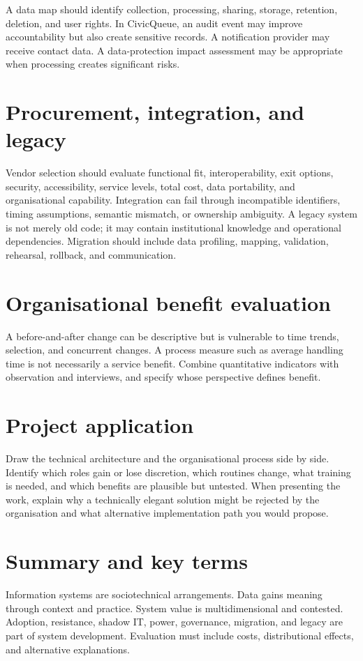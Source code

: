 A data map should identify collection, processing, sharing, storage, retention, deletion, and user rights. In CivicQueue, an audit event may improve accountability but also create sensitive records. A notification provider may receive contact data. A data-protection impact assessment may be appropriate when processing creates significant risks.

\section{Procurement, integration, and legacy}
Vendor selection should evaluate functional fit, interoperability, exit options, security, accessibility, service levels, total cost, data portability, and organisational capability. Integration can fail through incompatible identifiers, timing assumptions, semantic mismatch, or ownership ambiguity. A legacy system is not merely old code; it may contain institutional knowledge and operational dependencies. Migration should include data profiling, mapping, validation, rehearsal, rollback, and communication.

\section{Organisational benefit evaluation}
A before-and-after change can be descriptive but is vulnerable to time trends, selection, and concurrent changes. A process measure such as average handling time is not necessarily a service benefit. Combine quantitative indicators with observation and interviews, and specify whose perspective defines benefit.

\section{Project application}
Draw the technical architecture and the organisational process side by side. Identify which roles gain or lose discretion, which routines change, what training is needed, and which benefits are plausible but untested. When presenting the work, explain why a technically elegant solution might be rejected by the organisation and what alternative implementation path you would propose.

\section{Summary and key terms}
Information systems are sociotechnical arrangements. Data gains meaning through context and practice. System value is multidimensional and contested. Adoption, resistance, shadow IT, power, governance, migration, and legacy are part of system development. Evaluation must include costs, distributional effects, and alternative explanations.

